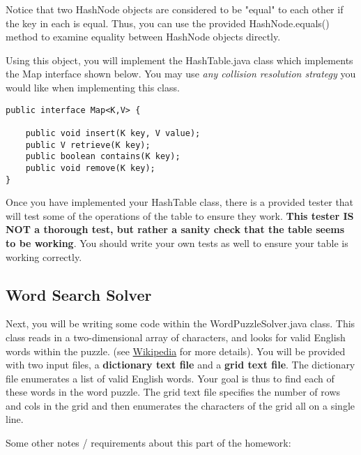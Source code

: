 \documentclass[paper=a4, fontsize=11pt, parskip=full]{scrartcl} %
\numberwithin{equation}{section} %
\numberwithin{figure}{section} %
\numberwithin{table}{section} %
\begin{document}
Notice that two HashNode objects are considered to be "equal" to each other if the key in each is equal. Thus, you can use the provided HashNode.equals() method to examine equality between HashNode objects directly.

Using this object, you will implement the HashTable.java class which implements the Map interface shown below. You may use \emph{any collision resolution strategy} you would like when implementing this class. 

\begin{lstlisting}
public interface Map<K,V> {

	public void insert(K key, V value);
	public V retrieve(K key);
	public boolean contains(K key);
	public void remove(K key);
}
\end{lstlisting}

Once you have implemented your HashTable class, there is a provided tester that will test some of the operations of the table to ensure they work. \textbf{This tester IS NOT a thorough test, but rather a sanity check that the table seems to be working}. You should write your own tests as well to ensure your table is working correctly.

\subsection{Word Search Solver}

Next, you will be writing some code within the WordPuzzleSolver.java class. This class reads in a two-dimensional array of characters, and looks for valid English words within the puzzle. (see \href{https://en.wikipedia.org/wiki/Word_search}{Wikipedia} for more details). You will be provided with two input files, a \textbf{dictionary text file} and a \textbf{grid text file}. The dictionary file enumerates a list of valid English words. Your goal is thus to find each of these words in the word puzzle. The grid text file specifies the number of rows and cols in the grid and then enumerates the characters of the grid all on a single line.

Some other notes / requirements about this part of the homework:
\end{document}
